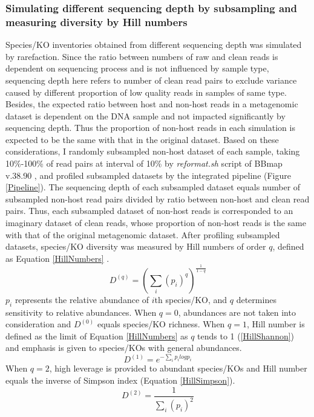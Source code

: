 \documentclass[11pt]{article}
\begin{document}
      \subsubsection{Simulating different sequencing depth by subsampling and measuring diversity by Hill numbers}
      Species/KO inventories obtained from different sequencing depth was simulated by rarefaction. 
      Since the ratio between numbers of raw and clean reads is dependent on sequencing process and is not influenced by sample type, sequencing depth here refers to number of clean read pairs to exclude variance caused by different proportion of low quality reads in samples of same type. 
      Besides, the expected ratio between host and non-host reads in a metagenomic dataset is dependent on the DNA sample and not impacted significantly by sequencing depth. 
      Thus the proportion of non-host reads in each simulation is expected to be the same with that in the original dataset. 
      \newline
      Based on these considerations, I randomly subsampled non-host dataset of each sample, taking 10\%-100\% of read pairs at interval of 10\% by \textit{reformat.sh} script of BBmap v.38.90 \citep{bushnell2014bbmap}, and profiled subsampled datasets by the integrated pipeline (Figure \ref{Pipeline}). 
      The sequencing depth of each subsampled dataset equals number of subsampled non-host read pairs divided by ratio between non-host and clean read pairs. 
      Thus, each subsampled dataset of non-host reads is corresponded to an imaginary dataset of clean reads, whose proportion of non-host reads is the same with that of the original metagenomic dataset. 
      \newline
      After profiling subsampled datasets, species/KO diversity was measured by Hill numbers of order $q$, defined as Equation \ref{HillNumbers} \citep{hill1973diversity}.
      \begin{equation}
        D^{(q)} = (\sum_{i}(p_i)^q)^{\frac{1}{1-q}}
        \label{HillNumbers}
      \end{equation}
      $p_i$ represents the relative abundance of $i$th species/KO, and $q$ determines sensitivity to relative abundances. 
      When $q = 0$, abundances are not taken into consideration and $D^{(0)}$ equals species/KO richness. 
      When $q = 1$, Hill number is defined as the limit of Equation \ref{HillNumbers} as $q$ tends to 1 (\ref{HillShannon}) and emphasis is given to species/KOs with general abundances.
      \begin{equation}
        D^{(1)} = e^{-\sum_{i}p_ilogp_i}
        \label{HillShannon}
      \end{equation}
      When $q = 2$, high leverage is provided to abundant species/KOs and Hill number equals the inverse of Simpson index (Equation \ref{HillSimpson}).
      \begin{equation}
        D^{(2)} = \frac{1}{\sum_{i}(p_i)^2}
        \label{HillSimpson}
      \end{equation}
\end{document}
